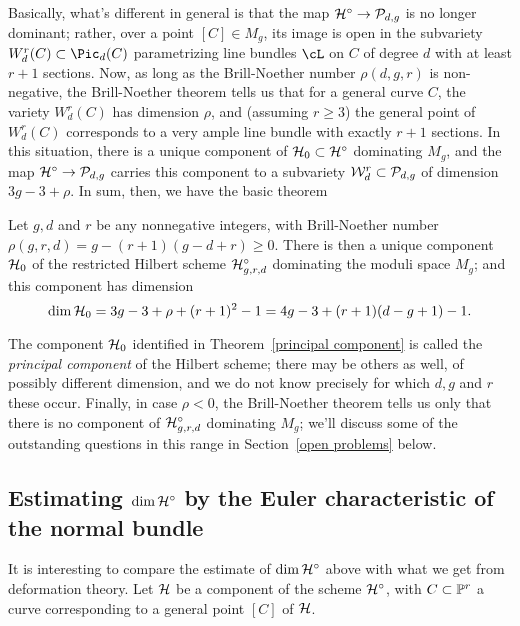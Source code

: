 Basically, what's different in general is that the map $\cH^\circ \to \cP_{d,g}$ is no longer dominant; rather, over a point $[C] \in M_g$, its image is open in the subvariety $W^r_d(C) \subset \Pic_d(C)$ parametrizing line bundles $\cL$ on $C$ of degree $d$ with at least $r+1$ sections. Now, as long as the Brill-Noether number $\rho(d,g,r)$ is non-negative, the Brill-Noether theorem tells us that for a general curve $C$, the variety $W^r_d(C)$ has dimension $\rho$, and (assuming $r \geq 3$) the general point of $W^r_d(C)$ corresponds to a very ample line bundle with exactly $r+1$ sections. In this situation, there is a unique component of $\cH_0 \subset \cH^\circ$ dominating $M_g$, and the map $\cH^\circ \to \cP_{d,g}$ carries this component to a subvariety $\cW^r_d \subset \cP_{d,g}$ of dimension $3g-3 + \rho$. In sum, then, we have the basic theorem

\begin{theorem}\label{principal component}
Let $g, d$ and $r$ be any nonnegative integers, with Brill-Noether number  $\rho(g,r,d) = g - (r+1)(g-d+r) \geq 0$. There is then a unique component $\cH_0$ of the restricted Hilbert scheme $\cH^\circ_{g,r,d}$ dominating the moduli space $M_g$; and this component has dimension
$$
\dim \cH_0 = 3g-3+\rho + (r+1)^2 - 1 = 4g-3 + (r+1)(d-g+1) - 1.
$$
\end{theorem}

 The component $\cH_0$ identified in Theorem~\ref{principal component} is called the \emph{principal component} of the Hilbert scheme; there may be others as well, of possibly different dimension, and we do not know precisely for which $d,g$ and $r$ these occur. Finally, in case $\rho < 0$, the Brill-Noether theorem tells us only that there is no component of $\cH^\circ_{g,r,d}$ dominating $M_g$; we'll discuss some of the outstanding questions in this range in Section~\ref{open problems} below. 


\subsection{Estimating $\dim \cH^\circ$ by the Euler characteristic of the normal bundle}

It is interesting to compare the estimate of  $\dim \cH^\circ$ above with what we get from deformation theory. Let $\cH$ be a component of the scheme $\cH^\circ$, with $C \subset \PP^r$ a curve corresponding to a general point $[C]$ of $\cH$.

